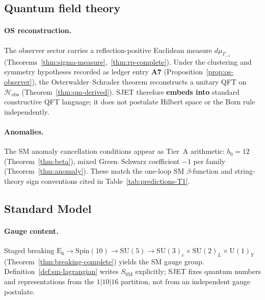 \documentclass[11pt]{article}
\theoremstyle{plain}
\theoremstyle{definition}
\theoremstyle{remark}
\numberwithin{equation}{section}
\newcommand{\E}[1]{\mathrm{E}_{#1}}
\newcommand{\Spin}{\mathrm{Spin}}
\begin{document}
\subsection{Quantum field theory}
\label{sec:standard-theories:qft}

\paragraph{OS reconstruction.}
The observer sector carries a reflection-positive Euclidean measure
$d\mu_{\Gamma_{-1}}$ (Theorems~\ref{thm:sigma-measure},~\ref{thm:rp-complete}).
Under the clustering and symmetry hypotheses recorded as ledger entry
\textbf{A7} (Proposition~\ref{prop:os-observer}), the Osterwalder--Schrader theorem
\cite{OsterwalderSchrader1973} reconstructs a unitary QFT on
$\mathcal{H}_{\mathrm{obs}}$ (Theorem~\ref{thm:qm-derived}). SJET therefore
\textbf{embeds into} standard constructive QFT language; it does not postulate
Hilbert space or the Born rule independently.

\paragraph{Anomalies.}
The SM anomaly cancellation conditions appear as Tier~A arithmetic:
$b_0=12$ (Theorem~\ref{thm:beta}), mixed Green--Schwarz coefficient $-1$ per
family (Theorem~\ref{thm:anomaly}). These match the one-loop SM $\beta$-function
and string-theory sign conventions cited in Table~\ref{tab:predictions-T1}.

\subsection{Standard Model}
\label{sec:standard-theories:sm}

\paragraph{Gauge content.}
Staged breaking
$\E{6}\to\Spin(10)\to\mathrm{SU}(5)\to\mathrm{SU}(3)_c\times\mathrm{SU}(2)_L\times\mathrm{U}(1)_Y$
(Theorem~\ref{thm:breaking-complete}) yields the SM gauge group.
Definition~\ref{def:sm-lagrangian} writes $S_{\mathrm{SM}}$ explicitly;
SJET fixes quantum numbers and representations from the $1|10|16$ partition,
not from an independent gauge postulate.
\end{document}
